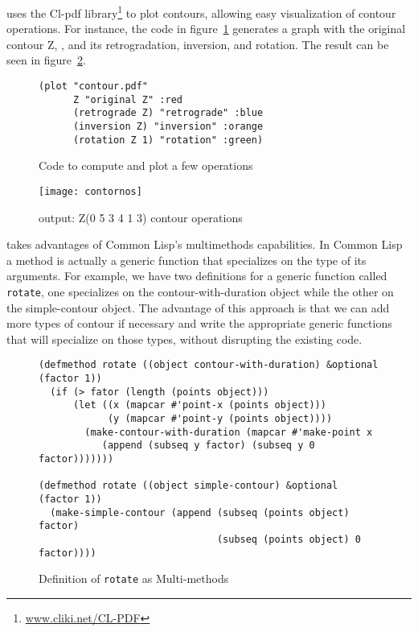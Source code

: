 \goiaba{} uses the Cl-pdf library\footnote{\url{www.cliki.net/CL-PDF}}
to plot contours, allowing easy visualization of contour operations.
For instance, the code in figure~\ref{fig:operations-code} generates a
graph with the original contour Z, , and its
retrogradation, inversion, and rotation. The result can be seen in
figure~\ref{fig:operacoes}.

\begin{figure}
  \centering
\begin{verbatim}
(plot "contour.pdf"
      Z "original Z" :red
      (retrograde Z) "retrograde" :blue
      (inversion Z) "inversion" :orange
      (rotation Z 1) "rotation" :green)
\end{verbatim}
  \caption{Code to compute and plot a few operations}
  \label{fig:operations-code}
\end{figure}

\begin{figure}
  \centering
  \texttt{[image: contornos]}
  \caption{\goiaba{} output: Z(0 5 3 4 1 3) contour operations}
  \label{fig:operacoes}
\end{figure}

\goiaba{} takes advantages of Common Lisp's multimethods capabilities.
In Common Lisp a method is actually a generic function that
specializes on the type of its arguments. For example, we have two
definitions for a generic function called \texttt{rotate}, one
specializes on the contour-with-duration object while the other on the
simple-contour object. The advantage of this approach is that we can
add more types of contour if necessary and write the appropriate
generic functions that will specialize on those types, without
disrupting the existing code.

\begin{figure*}
\begin{verbatim}
(defmethod rotate ((object contour-with-duration) &optional (factor 1))
  (if (> fator (length (points object)))
      (let ((x (mapcar #'point-x (points object)))
            (y (mapcar #'point-y (points object))))
        (make-contour-with-duration (mapcar #'make-point x
           (append (subseq y factor) (subseq y 0 factor)))))))

(defmethod rotate ((object simple-contour) &optional (factor 1))
  (make-simple-contour (append (subseq (points object) factor)
                               (subseq (points object) 0 factor))))
\end{verbatim}
  \caption{Definition of \texttt{rotate} as Multi-methods}
  \label{fig:code-methods}
\end{figure*}

